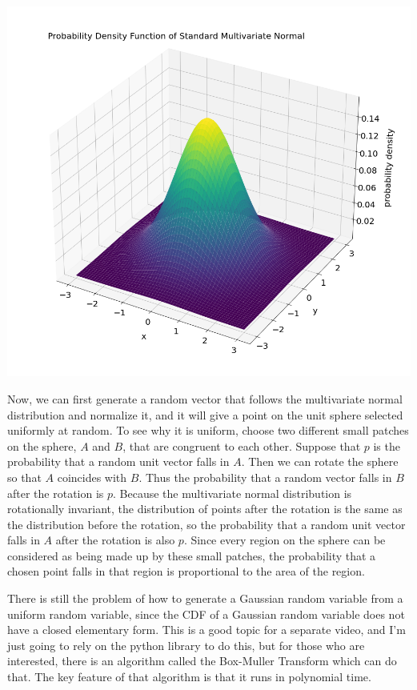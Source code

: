 \documentclass{article}
\begin{document}
\begin{center}
    \includegraphics[scale=0.3]{manim/project/images/Multivariate Normal PDF.png}
\end{center}

Now, we can first generate a random vector that follows the multivariate normal distribution and normalize it, and it will give a point on the unit sphere selected uniformly at random. To see why it is uniform, choose two different small patches on the sphere, $A$ and $B$, that are congruent to each other. Suppose that $p$ is the probability that a random unit vector falls in $A$. Then we can rotate the sphere so that $A$ coincides with $B$. Thus the probability that a random vector falls in $B$ after the rotation is $p$. Because the multivariate normal distribution is rotationally invariant, the distribution of points after the rotation is the same as the distribution before the rotation, so the probability that a random unit vector falls in $A$ after the rotation is also $p$. Since every region on the sphere can be considered as being made up by these small patches, the probability that a chosen point falls in that region is proportional to the area of the region.

There is still the problem of how to generate a Gaussian random variable from a uniform random variable, since the CDF of a Gaussian random variable does not have a closed elementary form. This is a good topic for a separate video, and I'm just going to rely on the python library to do this, but for those who are interested, there is an algorithm called the Box-Muller Transform which can do that. The key feature of that algorithm is that it runs in polynomial time.
\end{document}
